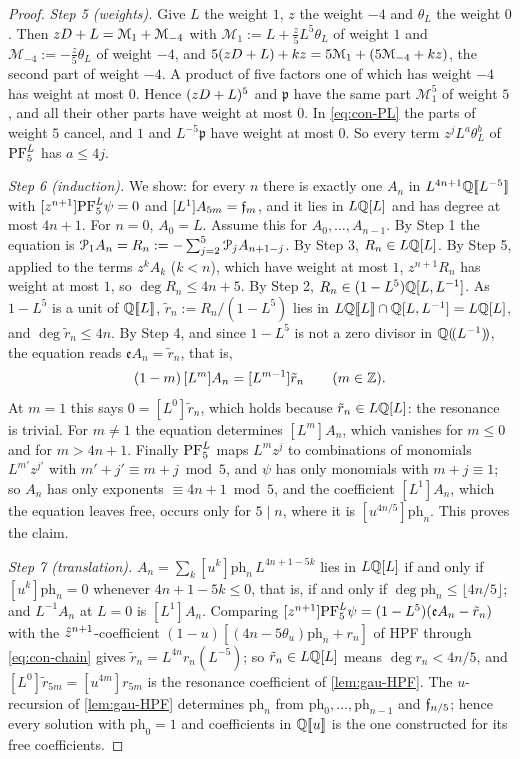 \begin{proof}
\emph{Step 5 (weights).} Give $L$ the weight $1$, $z$ the weight $-4$ and $\theta_L$ the weight $0$. Then $zD+L=\mathcal M_1+\mathcal M_{-4}$ with $\mathcal M_1:=L+\tfrac z5L^5\theta_L$ of weight $1$ and $\mathcal M_{-4}:=-\tfrac z5\theta_L$ of weight $-4$, and $5(zD+L)+kz=5\mathcal M_1+(5\mathcal M_{-4}+kz)$, the second part of weight $-4$. A product of five factors one of which has weight $-4$ has weight at most $0$. Hence $(zD+L)^5$ and $\mathfrak p$ have the same part $\mathcal M_1^5$ of weight $5$, and all their other parts have weight at most $0$. In \eqref{eq:con-PL} the parts of weight $5$ cancel, and $1$ and $L^{-5}\mathfrak p$ have weight at most $0$. So every term $z^jL^a\theta_L^b$ of $\mathrm{PF}_{5}^{L}$ has $a\leq4j$.

\emph{Step 6 (induction).} We show: for every $n$ there is exactly one $A_n$ in $L^{4n+1}\mathbb{Q}[\![ L^{-5} ]\!]$ with $[z^{n+1}]\mathrm{PF}_{5}^{L}\psi=0$ and $[L^1]A_{5m}=\mathfrak{f}_m$, and it lies in $L\mathbb{Q}[L]$ and has degree at most $4n+1$. For $n=0$, $A_0=L$. Assume this for $A_0,\dots,A_{n-1}$. By Step 1 the equation is $\mathcal{P}_1A_n=R_n:=-\sum_{j=2}^5\mathcal{P}_jA_{n+1-j}$. By Step 3, $R_n\in L\mathbb{Q}[L]$. By Step 5, applied to the terms $z^kA_k$ ($k<n$), which have weight at most $1$, $z^{n+1}R_n$ has weight at most $1$, so $\deg R_n\leq4n+5$. By Step 2, $R_n\in(1-L^5)\mathbb{Q}[L,L^{-1}]$. As $1-L^5$ is a unit of $\mathbb{Q}[\![ L ]\!]$, $\tilde r_n:=R_n/(1-L^5)$ lies in $L\mathbb{Q}[\![ L ]\!]\cap\mathbb{Q}[L,L^{-1}]=L\mathbb{Q}[L]$, and $\deg\tilde r_n\leq4n$. By Step 4, and since $1-L^5$ is not a zero divisor in $\mathbb{Q}(\!(L^{-1})\!)$, the equation reads $\mathfrak eA_n=\tilde r_n$, that is,
\[
(1-m)\,[L^m]A_n=[L^{m-1}]\tilde r_n\qquad(m\in\mathbb{Z}).
\]
At $m=1$ this says $0=[L^0]\tilde r_n$, which holds because $\tilde r_n\in L\mathbb{Q}[L]$: the resonance is trivial. For $m\neq1$ the equation determines $[L^m]A_n$, which vanishes for $m\leq0$ and for $m>4n+1$. Finally $\mathrm{PF}_{5}^{L}$ maps $L^mz^j$ to combinations of monomials $L^{m'}z^{j'}$ with $m'+j'\equiv m+j\bmod5$, and $\psi$ has only monomials with $m+j\equiv1$; so $A_n$ has only exponents $\equiv4n+1\bmod5$, and the coefficient $[L^1]A_n$, which the equation leaves free, occurs only for $5\mid n$, where it is $[u^{4n/5}]\mathrm{ph}_n$. This proves the claim.

\emph{Step 7 (translation).} $A_n=\sum_k[u^k]\mathrm{ph}_n\,L^{4n+1-5k}$ lies in $L\mathbb{Q}[L]$ if and only if $[u^k]\mathrm{ph}_n=0$ whenever $4n+1-5k\leq0$, that is, if and only if $\deg\mathrm{ph}_n\leq\lfloor4n/5\rfloor$; and $L^{-1}A_n$ at $L=0$ is $[L^1]A_n$. Comparing $[z^{n+1}]\mathrm{PF}_{5}^{L}\psi=(1-L^5)(\mathfrak eA_n-\tilde r_n)$ with the $\hat{z}^{n+1}$-coefficient $(1-u)[(4n-5\theta_u)\mathrm{ph}_n+r_n]$ of HPF through \eqref{eq:con-chain} gives $\tilde r_n=L^{4n}r_n(L^{-5})$; so $\tilde r_n\in L\mathbb{Q}[L]$ means $\deg r_n<4n/5$, and $[L^0]\tilde r_{5m}=[u^{4m}]r_{5m}$ is the resonance coefficient of \cref{lem:gau-HPF}. The $u$-recursion of \cref{lem:gau-HPF} determines $\mathrm{ph}_n$ from $\mathrm{ph}_0,\dots,\mathrm{ph}_{n-1}$ and $\mathfrak{f}_{n/5}$; hence every solution with $\mathrm{ph}_0=1$ and coefficients in $\mathbb{Q}[\![ u ]\!]$ is the one constructed for its free coefficients.
\end{proof}

